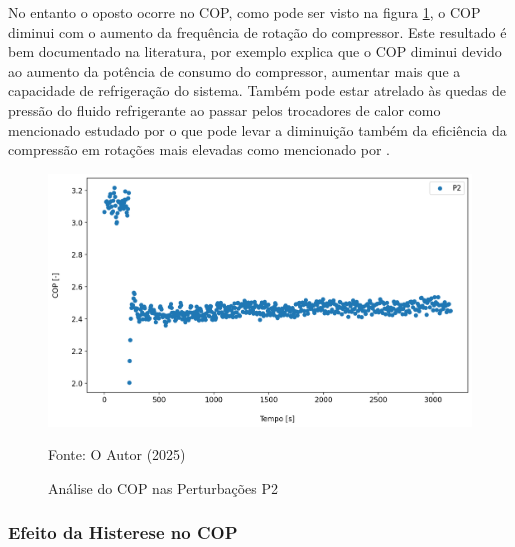 No entanto o oposto ocorre no COP, como pode ser visto na figura \ref{fig:Análise do COP Rotação}, o COP diminui com o aumento da frequência de rotação do compressor. Este resultado é bem documentado na literatura, por exemplo \textcite{MASCHE2021302} explica que o COP diminui devido ao aumento da potência de consumo do compressor, aumentar mais que a capacidade de refrigeração do sistema. Também pode estar atrelado às quedas de pressão do fluido refrigerante ao passar pelos trocadores de calor como mencionado estudado por \textcite{CONSTANTINO2022101048} o que pode levar a diminuição também da eficiência da compressão em rotações mais elevadas como mencionado por \textcite{stoecker1998industrial}.
\newpage
\begin{figure}[h]
    \centering
    \includegraphics[width=1\linewidth]{FigurasdoTexto/COP Perturbação Rot.png}
    \caption{Análise do COP nas Perturbações P2}
    \label{fig:Análise do COP Rotação}
    {\footnotesize Fonte: O Autor (2025)}
\end{figure}

\subsubsection{Efeito da Histerese no COP}

